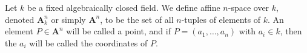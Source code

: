 Let $k$ be a fixed algebraically closed field. We define affine $n$-space over $k$, denoted $\mathbf{A}_k^n$ or simply $\mathbf{A}^n$, to be the set of all $n$-tuples of elements of $k$. An element $P \in \mathbf{A}^n$ will be called a point, and if $P = (a_1, \ldots, a_n)$ with $a_i \in k$, then the $a_i$ will be called the coordinates of $P$.
